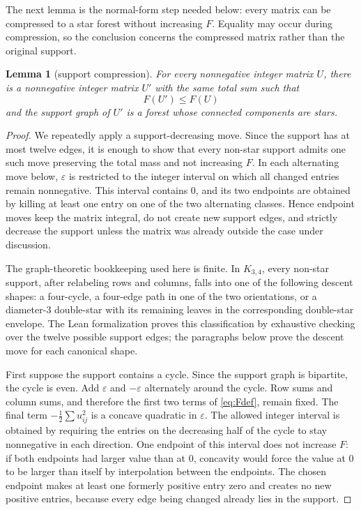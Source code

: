 \documentclass[12pt]{article}
\theoremstyle{plain}
\newtheorem{lemma}[theorem]{Lemma}
\theoremstyle{definition}
\theoremstyle{remark}
\begin{document}
The next lemma is the normal-form step needed below: every matrix can be
compressed to a star forest without increasing \(F\).  Equality may occur during
compression, so the conclusion concerns the compressed matrix rather than the
original support.

\begin{lemma}[support compression]\label{lem:compression}
For every nonnegative integer matrix \(U\), there is a nonnegative integer
matrix \(U'\) with the same total sum such that
\[
  F(U')\le F(U)
\]
and the support graph of \(U'\) is a forest whose connected components are
stars.
\end{lemma}

\begin{proof}
We repeatedly apply a support-decreasing move.  Since the support has at most
twelve edges, it is enough to show that every non-star support admits one such
move preserving the total mass and not increasing \(F\).  In each alternating
move below, \(\varepsilon\) is restricted to the integer interval on which all
changed entries remain nonnegative.  This interval contains \(0\), and its two
endpoints are obtained by killing at least one entry on one of the two
alternating classes.  Hence endpoint moves keep the matrix integral, do not
create new support edges, and strictly decrease the support unless the matrix
was already outside the case under discussion.

The graph-theoretic bookkeeping used here is finite.  In \(K_{3,4}\), every
non-star support, after relabeling rows and columns, falls into one of the
following descent shapes: a four-cycle, a four-edge path in one of the two
orientations, or a diameter-\(3\) double-star with its remaining leaves in the
corresponding double-star envelope.  The Lean formalization proves this
classification by exhaustive checking over the twelve possible support edges;
the paragraphs below prove the descent move for each canonical shape.

First suppose the support contains a cycle.  Since the support graph is
bipartite, the cycle is even.  Add \(\varepsilon\) and \(-\varepsilon\)
alternately around the cycle.  Row sums and column sums, and therefore the
first two terms of \eqref{eq:Fdef}, remain fixed.  The final term
\(-\frac12\sum u_{ij}^2\) is a concave quadratic in \(\varepsilon\).  The
allowed integer interval is obtained by requiring the entries on the
decreasing half of the cycle to stay nonnegative in each direction.  One
endpoint of this interval does not increase \(F\): if both endpoints had larger
value than at \(0\), concavity would force the value at \(0\) to be larger than
itself by interpolation between the endpoints.  The chosen endpoint makes at
least one formerly positive entry zero and creates no new positive entries,
because every edge being changed already lies in the support.


\end{proof}
\end{document}
